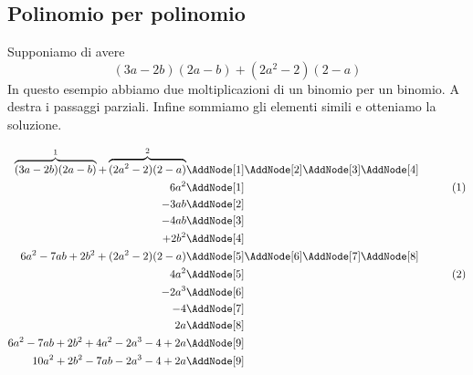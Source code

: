 \subsection{Polinomio per polinomio}
\begin{esempiot}{}{}
Supponiamo di avere \[(3a-2b)(2a-b)+(2a^2-2)(2-a)\]
 In questo esempio abbiamo due moltiplicazioni di un binomio per un binomio. A destra i passaggi parziali. Infine sommiamo  gli elementi simili e otteniamo la soluzione.
 \begin{NodesList}
 	\begin{align*}
 		\overbrace{(3a-2b)(2a-b)}^{1}+\overbrace{(2a^2-2)(2-a)}^{2}&\nonumber\AddNode[1]\AddNode[2]\AddNode[3]\AddNode[4]\\
 		6a^2&\AddNode[1]&\tag{1}\\ 
 		-3ab&\AddNode[2]&\\
 		-4ab&\AddNode[3]&\\    
 		+2b^2&\AddNode[4]&\\
 		6a^2-7ab+2b^2+(2a^2-2)(2-a)&\nonumber\AddNode[5]\AddNode[6]\AddNode[7]\AddNode[8]\\
 		4a^2&\AddNode[5]&\tag{2}\\
 		-2a^3&\AddNode[6]&\\
 		-4 &\AddNode[7]&\\   
 		2a&\AddNode[8]&\\   
 		6a^2-7ab+2b^2+4a^2-2a^3-4+2a&\nonumber\AddNode[9]\\
 		10a^2+2b^2-7ab-2a^3-4+2a&\nonumber\AddNode[9]
 	\end{align*}
 \end{NodesList}
\end{esempiot}
